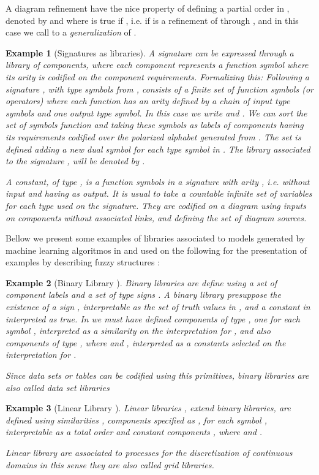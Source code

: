 \documentclass[oribibl]{llncs}
\newtheorem{exam}{Example}
\begin{document}
A diagram refinement  have the nice property of defining a partial order in , denoted by  and where  is true if , i.e. if  is a refinement of  through , and in this case we call to  a \emph{generalization} of .

\begin{exam}[Signatures as libraries]\label{ex:signature}
A signature can be expressed through a library of components, where each component represents a function symbol where its arity is codified on the component requirements. Formalizing this: Following \cite{Makki89} a signature
,  with type symbols from , consists of a finite
set  of function symbols (or operators)  where each
function  has an arity  defined by a chain of
input type symbols and one output type symbol. In this case we write
 and . We can sort the set  of symbols
function and taking these symbols as labels of components having its
requirements codified over the polarized alphabet  generated from
. The set  is defined adding a new dual symbol  for
each type symbol  in . The library associated to the signature
, will be denoted by .

A constant, of type , is a function symbols in a signature with
arity , i.e. without input and having  as output. It
is usual to take a countable infinite set of variables for each type
used on the signature. They are codified on a diagram using
inputs on components without associated links, and defining the
set of diagram sources.
\end{exam}

Bellow we present some examples of libraries associated to models generated by machine learning algoritmos in \cite{Michell86} and used on the following for the presentation of examples by describing fuzzy structures :
\begin{exam}[Binary Library ]\label{binarylibrary}
Binary libraries are define using a set of component labels  and a set of type signs . A binary library  presuppose the existence of a sign , interpretable as the set  of truth values in , and a
constant  in  interpreted as true. In  we must have  defined  components of type , one for each symbol , interpreted as a
similarity  on the interpretation for , and also components of type , where  and , interpreted as a constants selected on the interpretation for .

Since data sets or tables can be codified using this primitives, binary libraries are also called data set libraries
\end{exam}

\begin{exam}[Linear Library ]\label{linearlibrary}
Linear libraries , extend binary libraries, are defined
using similarities , components specified as
, for each symbol , interpretable as a total order
and constant components , where  and .

Linear library are associated to processes for the discretization of continuous domains in this sense they are also called grid libraries.
\end{exam}
\end{document}

